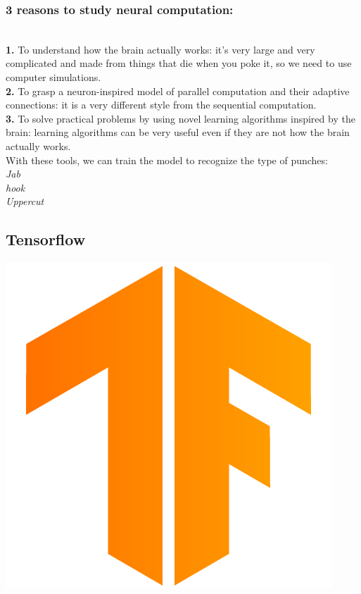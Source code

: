 \documentclass[a4paper,12pt]{report}
\begin{document}
\subsubsection{3 reasons to study neural computation:}\\
\textbf{1.} To understand how the brain actually works: it's very large and very complicated and made from things that die when you poke it, so we need to use computer simulations.\\
\textbf{2.} To grasp a neuron-inspired model of parallel computation and their adaptive connections: it is a very different style from the sequential computation.\\
\textbf{3.} To solve practical problems by using novel learning algorithms inspired by the brain: learning algorithms can be very useful even if they are not how the brain actually works.
\\
With these tools, we can train the model to recognize the type of punches:\\
\textit{Jab\\hook\\Uppercut}
\subsection{Tensorflow}
\includegraphics[scale=.04]{images/tensorflow.png}
\end{document}
